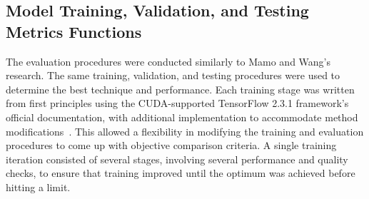 \subsection{Model Training, Validation, and Testing Metrics Functions} \label{subsec:t_model}
%
The evaluation procedures were conducted similarly to Mamo and \linebreak Wang's \cite{mamo_long_2020} research.
The same training, validation, and testing procedures were used to determine the best technique and performance.
Each training stage was written from first principles using the CUDA-supported TensorFlow 2.3.1 framework's official documentation, with additional implementation to accommodate method modifications~\cite{chollet_writing_2020}.
This allowed a flexibility in modifying the training and evaluation procedures to come up with objective comparison criteria.
A single training iteration consisted of several stages, involving several performance and quality checks, to ensure that training improved until the optimum was achieved before hitting a limit.


